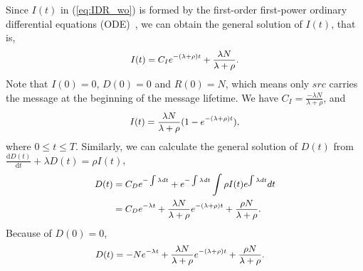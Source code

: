 Since $I(t)$ in (\ref{eq:IDR_wo}) is formed by the first-order first-power
ordinary differential equations (ODE)~\cite{CC2007PerfAnaly},
we can obtain the general solution of $I(t)$, that is,
\begin{equation}
\begin{small}
\nonumber
\begin{aligned}
I(t) = C_{I} e^{-(\lambda + \rho)t}
+ \frac{ \lambda N }{ \lambda + \rho }.
\end{aligned}
\end{small}
\end{equation}
Note that $I(0)=0$, $D(0)=0$ and $R(0)=N$,
which means only $src$ carries the message
at the beginning of the message lifetime.
We have $C_{I} = \frac{ -\lambda N }{ \lambda + \rho }$, and
\begin{equation}
\begin{small}
\nonumber
\begin{aligned}
I(t) = \frac{ \lambda N }{ \lambda + \rho }(1- e^{-(\lambda + \rho)t}),
\end{aligned}
\end{small}
\end{equation}
where $0 \le t \le T$.
Similarly, we can calculate
the general solution of $D(t)$
from $\frac{\mathrm{d} D(t)}{\mathrm{d} t} + \lambda D(t) = \rho I(t)$,
\begin{equation}
\begin{small}
\label{eq:D_formula}
\begin{aligned}
D(t) &= C_{D} e^{-\int \lambda dt} + e^{-\int \lambda dt}
\int \rho I(t) e^{\int \lambda dt} dt \\
&= C_{D} e^{- \lambda t} + \frac{ \lambda N }{ \lambda + \rho }
e^{-(\lambda + \rho)t} + \frac{ \rho N }{ \lambda + \rho }.
\end{aligned}
\end{small}
\end{equation}
Because of $D(0)=0$,
\begin{equation}
\begin{small}
\nonumber
\begin{aligned}
D(t) &= -N e^{- \lambda t} + \frac{ \lambda N }{ \lambda + \rho } e^{-(\lambda + \rho)t} + \frac{ \rho N }{ \lambda + \rho }.
\end{aligned}
\end{small}
\end{equation}
